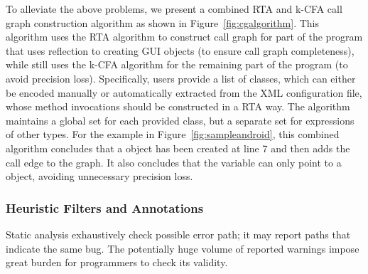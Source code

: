 To alleviate the above problems, we present a combined RTA and k-CFA
call graph construction algorithm as shown in Figure~\ref{fig:cgalgorithm}.
This algorithm uses the RTA algorithm to construct call graph for part of the program that
uses reflection to creating GUI objects (to ensure call graph completeness), while still uses
the k-CFA algorithm for the remaining part of the program (to avoid precision loss). Specifically,
users provide a list of classes, which can either be encoded manually or
automatically extracted from the XML configuration file, whose method invocations should be
constructed in a RTA way. The algorithm maintains a global set for
each  provided class, but a separate set for expressions of other
types.  For the example in Figure~\ref{fig:sampleandroid}, this
combined algorithm concludes that a  object has been
created at line 7 and then adds the call edge  to the
graph. It also concludes that the  variable can only
point to a  object, avoiding unnecessary precision loss.










\subsubsection{Heuristic Filters and Annotations}
\label{sec:heuristic}

Static analysis exhaustively check possible error path; it may report
paths that indicate the same bug. The potentially huge volume of
reported warnings impose great burden for programmers to check
its validity. 


